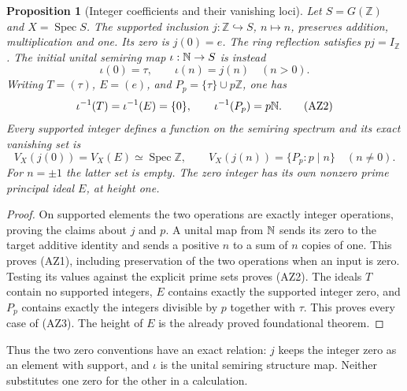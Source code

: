 \documentclass[11pt,a4paper]{article}
\newtheorem{proposition}[theorem]{Proposition}
\theoremstyle{definition}\newtheorem{definition}[theorem]{Definition}
\newcommand{\Z}{\mathbb Z}\newcommand{\Q}{\mathbb Q}
\newcommand{\Spec}{\operatorname{Spec}}\newcommand{\SpecMon}{\operatorname{Spec}_{\mathrm{mon}}}
\begin{document}
\begin{proposition}[Integer coefficients and their vanishing loci]
Let $S=G(\Z)$ and $X=\Spec S$. The supported inclusion
$j:\Z\hookrightarrow S$, $n\mapsto n$, preserves addition, multiplication
and one. Its zero is $j(0)=e$. The ring reflection satisfies $pj=I_\Z$.
The initial unital semiring map $\iota:\mathbb N\to S$ is instead
\[
 \iota(0)=\tau,\qquad \iota(n)=j(n)\quad(n>0).
 \tag{AZ1}
\]
Writing $T=(\tau)$, $E=(e)$, and $P_p=\{\tau\}\cup p\Z$, one has
\[
 \iota^{-1}(T)=\iota^{-1}(E)=\{0\},\qquad
 \iota^{-1}(P_p)=p\mathbb N.
 \tag{AZ2}
\]
Every supported integer defines a function on the semiring spectrum and
its exact vanishing set is
\[
 V_X(j(0))=V_X(E)\simeq\Spec\Z,\qquad
 V_X(j(n))=\{P_p:p\mid n\}\quad(n\ne0).
 \tag{AZ3}
\]
For $n=\pm1$ the latter set is empty. The zero integer has its own
nonzero prime principal ideal $E$, at height one.
\end{proposition}
\begin{proof}
On supported elements the two operations are exactly integer operations,
proving the claims about $j$ and $p$. A unital map from $\mathbb N$ sends its zero
to the target additive identity and sends a positive $n$ to a sum of $n$
copies of one. This proves (AZ1), including preservation of the two
operations when an input is zero. Testing its values against the explicit
prime sets proves (AZ2). The ideals $T$ contain no supported integers,
$E$ contains exactly the supported integer zero, and $P_p$ contains exactly
the integers divisible by $p$ together with $\tau$. This proves every case
of (AZ3). The height of $E$ is the already proved foundational theorem.
\end{proof}

Thus the two zero conventions have an exact relation: $j$ keeps the
integer zero as an element with support, and $\iota$ is the unital semiring
structure map. Neither substitutes one zero for the other in a calculation.
\end{document}
